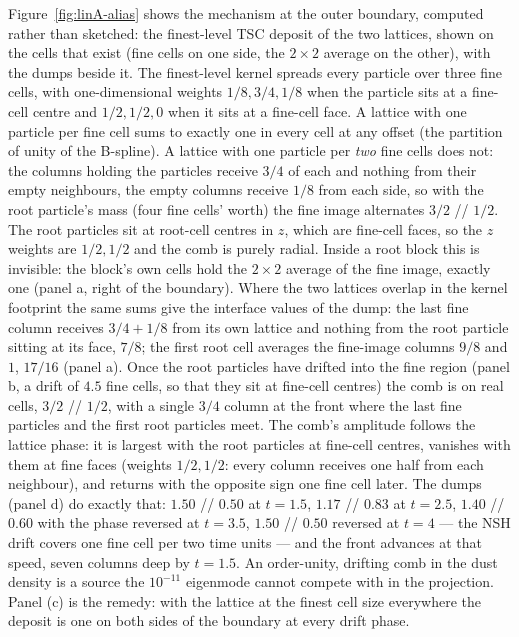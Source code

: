 \documentclass[11pt]{article}
\begin{document}
Figure~\ref{fig:linA-alias} shows the mechanism at the outer boundary, computed rather than
sketched: the finest-level TSC deposit of the two lattices, shown on the cells that exist
(fine cells on one side, the $2\times2$ average on the other), with the dumps beside it.
The finest-level kernel spreads every particle over three fine cells, with one-dimensional
weights $1/8, 3/4, 1/8$ when the particle sits at a fine-cell centre and $1/2, 1/2, 0$
when it sits at a fine-cell face. A lattice with one particle per fine cell sums to exactly
one in every cell at any offset (the partition of unity of the B-spline). A lattice with
one particle per \emph{two} fine cells does not: the columns holding the particles receive
$3/4$ of each and nothing from their empty neighbours, the empty columns receive $1/8$
from each side, so with the root particle's mass (four fine cells' worth) the fine image
alternates $3/2$ // $1/2$. The root particles sit at root-cell centres in $z$, which are
fine-cell faces, so the $z$ weights are $1/2, 1/2$ and the comb is purely radial. Inside a
root block this is invisible: the block's own cells hold the $2\times2$ average of the fine
image, exactly one (panel a, right of the boundary). Where the two lattices overlap in the
kernel footprint the same sums give the interface values of the dump: the last fine column
receives $3/4 + 1/8$ from its own lattice and nothing from the root particle sitting at its
face, $7/8$; the first root cell averages the fine-image columns $9/8$ and $1$, $17/16$
(panel a). Once the root particles have drifted into the fine region (panel b, a drift of
$4.5$ fine cells, so that they sit at fine-cell centres) the comb is on real cells,
$3/2$ // $1/2$, with a single $3/4$ column at the front where the last fine particles and
the first root particles meet. The comb's amplitude follows the lattice phase: it is
largest with the root particles at fine-cell centres, vanishes with them at fine faces
(weights $1/2, 1/2$: every column receives one half from each neighbour), and returns with
the opposite sign one fine cell later. The dumps (panel d) do exactly that:
$1.50$ // $0.50$ at $t = 1.5$, $1.17$ // $0.83$ at $t = 2.5$, $1.40$ // $0.60$ with the
phase reversed at $t = 3.5$, $1.50$ // $0.50$ reversed at $t = 4$ --- the NSH drift covers
one fine cell per two time units --- and the front advances at that speed, seven columns
deep by $t = 1.5$. An order-unity, drifting comb in the dust density is a source the
$10^{-11}$ eigenmode cannot compete with in the projection. Panel (c) is the remedy: with
the lattice at the finest cell size everywhere the deposit is one on both sides of the
boundary at every drift phase.
\end{document}

